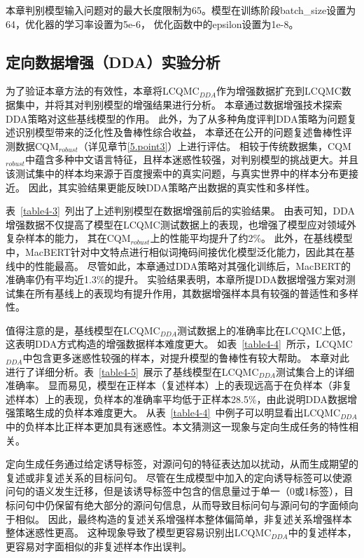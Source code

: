 本章判别模型输入问题对的最大长度限制为65。模型在训练阶段batch\_size设置为64，优化器的学习率设置为5e-6，
优化函数中的epsilon设置为1e-8。

\subsection{定向数据增强（DDA）实验分析}

为了验证本章方法的有效性，本章将LCQMC$_{DDA}$作为增强数据扩充到LCQMC数据集中，并将其对判别模型的增强结果进行分析。
本章通过数据增强技术探索DDA策略对这些基线模型的作用。
此外，为了从多种角度评判DDA策略为问题复述识别模型带来的泛化性及鲁棒性综合收益，
本章还在公开的问题复述鲁棒性评测数据CQM$_{robust}$（详见章节\ref{5.point3}）上进行评估。
相较于传统数据集，CQM$_{robust}$中蕴含多种中文语言特征，且样本迷惑性较强，对判别模型的挑战更大。并且该测试集中的样本均来源于百度搜索中的真实问题，与真实世界中的样本分布更接近。
因此，其实验结果更能反映DDA策略产出数据的真实性和多样性。



表~\ref{table4-3}~列出了上述判别模型在数据增强前后的实验结果。
由表可知，DDA增强数据不仅提高了模型在LCQMC测试数据上的表现，也增强了模型应对领域外复杂样本的能力，
其在CQM$_{robust}$上的性能平均提升了约2\%。
此外，在基线模型中，MacBERT针对中文特点进行相似词掩码间接优化模型泛化能力，因此其在基线中的性能最高。
尽管如此，本章通过DDA策略对其强化训练后，MacBERT的准确率仍有平均近1.3\%的提升。
实验结果表明，本章所提DDA数据增强方案对测试集在所有基线上的表现均有提升作用，其数据增强样本具有较强的普适性和多样性。



值得注意的是，基线模型在LCQMC$_{DDA}$测试数据上的准确率比在LCQMC上低，这表明DDA方式构造的增强数据样本难度更大。
如表~\ref{table4-4}~所示，LCQMC$_{DDA}$中包含更多迷惑性较强的样本，对提升模型的鲁棒性有较大帮助。
本章对此进行了详细分析。表~\ref{table4-5}~展示了基线模型在LCQMC$_{DDA}$测试集合上的详细准确率。
显而易见，模型在正样本（复述样本）上的表现远高于在负样本（非复述样本）上的表现，负样本的准确率平均低于正样本28.5\%，由此说明DDA数据增强策略生成的负样本难度更大。
从表~\ref{table4-4}~中例子可以明显看出LCQMC$_{DDA}$中的负样本比正样本更加具有迷惑性。本文猜测这一现象与定向生成任务的特性相关。

定向生成任务通过给定诱导标签，对源问句的特征表达加以扰动，从而生成期望的复述或非复述关系的目标问句。
尽管在生成模型中加入的定向诱导标签可以使源问句的语义发生迁移，但是该诱导标签中包含的信息量过于单一（0或1标签），目标问句中仍保留有绝大部分的源问句信息，从而导致目标问句与源问句的字面倾向于相似。
因此，最终构造的复述关系增强样本整体偏简单，非复述关系增强样本整体迷惑性更高。
这种现象导致了模型更容易识别出LCQMC$_{DDA}$中的复述样本，更容易对字面相似的非复述样本作出误判。


